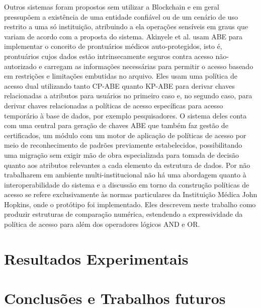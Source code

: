 \documentclass[a4paper,11pt]{article}
\begin{document}
Outros sistemas foram propostos sem utilizar a Blockchain e em geral pressupõem a existência de uma entidade confiável ou de um cenário de uso restrito a uma só instituição, atribuindo a ela operações sensíveis em graus que variam de acordo com a proposta do sistema.
Akinyele et al. \cite{Akinyele2010} usam ABE para implementar o conceito de prontuários médicos auto-protegidos, isto é, prontuários cujos dados estão intrinsecamente seguros contra acesso não-autorizado e carregam as informações necessárias para permitir o acesso baseado em restrições e limitações embutidas no arquivo.
Eles usam uma política de acesso dual utilizando tanto CP-ABE quanto KP-ABE para derivar chaves relacionadas a atributos para usuários no primeiro caso e, no segundo caso, para derivar chaves relacionadas a políticas de acesso específicas para acesso temporário à base de dados, por exemplo pesquisadores.
O sistema deles conta com uma central para geração de chaves ABE que também faz gestão de certificados, um módulo com um motor de aplicação de políticas de acesso por meio de reconhecimento de padrões previamente estabelecidos, possibilitando uma migração sem exigir mão de obra especializada para tomada de decisão quanto aos atributos relevantes a cada elemento da estrutura de dados.
Por não trabalharem em ambiente multi-institucional não há uma abordagem quanto à interoperabilidade do sistema e a discussão em torno da construção políticas de acesso se refere exclusivamente às normas particulares da Instituição Médica John Hopkins, onde o protótipo foi implementado.
Eles descrevem neste trabalho como produzir estruturas de comparação numérica, estendendo a expressividade da política de acesso para além dos operadores lógicos AND e OR.

\newpage
\section{Resultados Experimentais}



\newpage
\section{Conclusões e Trabalhos futuros}




\newpage
\end{document}
